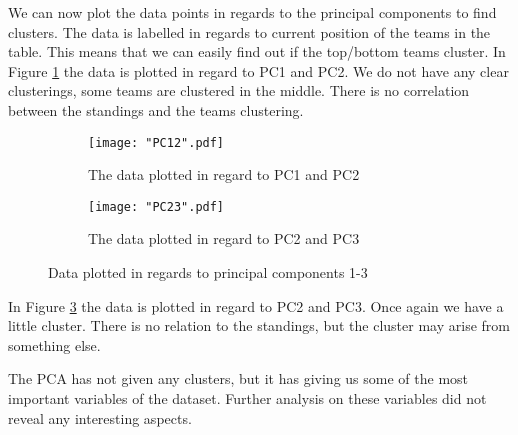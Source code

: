 \documentclass[Report.tex]{subfiles}
\begin{document}
We can now plot the data points in regards to the principal components to find clusters. The data is labelled in regards to current position of the teams in the table. This means that we can easily find out if the top/bottom teams cluster. In Figure \ref{fig:PC12} the data is plotted in regard to PC1 and PC2. We do not have any clear clusterings, some teams are clustered in the middle. There is no correlation between the standings and the teams clustering.

\begin{figure}
\center
\begin{subfigure}[b]{0.49\textwidth}
\texttt{[image: "PC12".pdf]}
\caption{The data plotted in regard to PC1 and PC2}
\label{fig:PC12}
\end{subfigure}
\begin{subfigure}[b]{0.49\textwidth}
\texttt{[image: "PC23".pdf]}
\caption{The data plotted in regard to PC2 and PC3}
\label{fig:PC23}
\end{subfigure}
\caption{Data plotted in regards to principal components 1-3}

\end{figure}
In Figure \ref{fig:PC23} the data is plotted in regard to PC2 and PC3. Once again we have a little cluster. There is no relation to the standings, but the cluster may arise from something else.

The PCA has not given any clusters, but it has giving us some of the most important variables of the dataset. Further analysis on these variables did not reveal any interesting aspects. 
\end{document}
